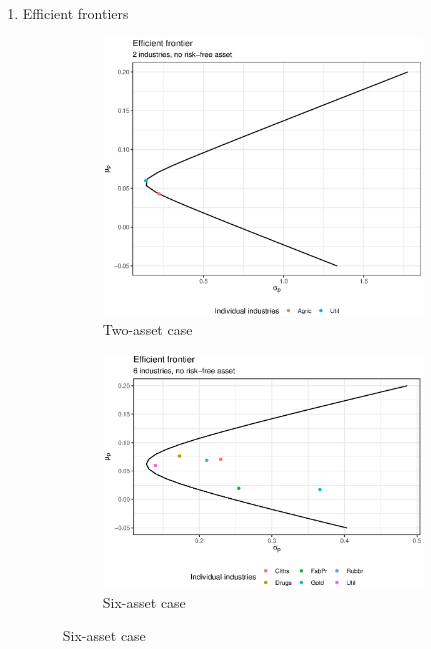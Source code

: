 \documentclass[11pt]{article}
\begin{document}
\begin{enumerate}
	\newpage
	\item Efficient frontiers
		\begin{figure}[!hbtp]
			\caption{Efficient Frontiers}
			\begin{subfigure}{.5\textwidth}
				\centering
				\includegraphics[width=.8\linewidth]{plot_6a.eps}
				\caption{Two-asset case}
				\label{fig1_a}
			\end{subfigure}%
			\begin{subfigure}{.5\textwidth}
				\centering
				\includegraphics[width=.8\linewidth]{plot_6b}
				\caption{Six-asset case}
				\label{fig1_b}
			\end{subfigure}
			\label{fig1}
		\end{figure}
	

\end{enumerate}
\end{document}
